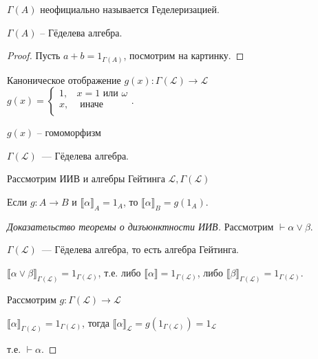 \begin{remark}
    $\Gamma (A)$ неофициально называется Геделеризацией.
\end{remark}

\begin{theorem}
  $\Gamma(A)$ -- Гёделева алгебра.
\end{theorem}
\begin{proof}
    Пусть $a+b = 1_{\Gamma(A)}$, посмотрим на картинку.
\end{proof}

\begin{definition}
    Каноническое отображение $g(x): \Gamma(\mathcal L) \to \mathcal L$\\
    $g(x) = \begin{cases}
        1,& x = 1 \text{ или } \omega\\
        x,& \text{ иначе}\\
    \end{cases} $.
\end{definition}
\begin{statement}
        $g(x)$ -- гомоморфизм
\end{statement}

\begin{statement}
    $\Gamma(\mathcal L)$~--- Гёделева алгебра.
\end{statement}

\begin{theorem}
    Рассмотрим ИИВ и алгебры Гейтинга $\mathcal L, \Gamma (\mathcal{L})$
\end{theorem}

\begin{statement}
    Если $g: A \to B$ и $\llbracket\alpha\rrbracket_A = 1_A$, то
    $\llbracket \alpha \rrbracket_B = g(1_A)$.
\end{statement}


\begin{proof}[Доказательство теоремы о дизъюнктности ИИВ]

    Рассмотрим $\vdash \alpha \vee \beta$.

    $\Gamma (\mathcal L)$~--- Гёделева алгебра, то есть алгебра Гейтинга.

    $\llbracket \alpha \lor \beta \rrbracket_{\Gamma(\mathcal L)} = 1_{\Gamma(\mathcal L)}$,
    т.е. либо $\llbracket \alpha \rrbracket =1_{\Gamma({\mathcal L})}$, либо $\llbracket \beta \rrbracket _{\Gamma(\mathcal L)} = 1_{\Gamma(\mathcal L)}$.

    Рассмотрим $g : \Gamma(\mathcal{L}) \to \mathcal{L}$

    $\llbracket \alpha \rrbracket _{\Gamma(\mathcal L )} = 1_{\Gamma(\mathcal L)}$, тогда $\llbracket \alpha \rrbracket _{\mathcal L} = g(1_{\Gamma(\mathcal L)}) = 1_{\mathcal L}$

    т.е. $\vdash \alpha$.
\end{proof}

